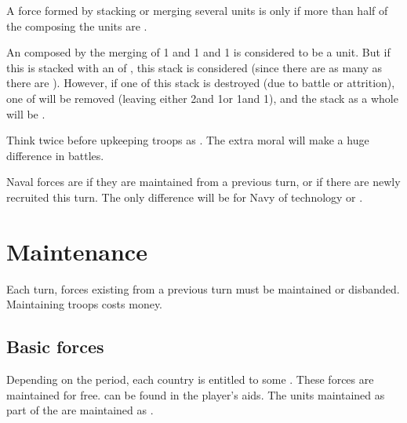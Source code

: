  A force formed by stacking or merging several units is
 only if more than half of the \LD composing the units are
.
\begin{exemple}
  An \ARMY\faceplus composed by the merging of 1  \LD and 1
   \ARMY\facemoins and 1  \LD is considered to
  be a  unit. But if this \ARMY\faceplus is stacked with an
  \ARMY\facemoins of , this stack is considered
   (since there are as many  as there are
  ). However, if one \LD of this stack is destroyed (due to
  battle or attrition), one \LD of  will be removed (leaving
  either 2\ARMY\facemoins and 1\LD or 1\ARMY\faceplus and 1\LD), and the stack
  as a whole will be .
\end{exemple}

\begin{designnote}
  Think twice before upkeeping troops as . The extra moral
  will make a huge difference in battles.
\end{designnote}

\aparag[Navy] Naval forces are  if they are maintained from a
previous turn, or  if there are newly recruited this turn.
\bparag The only difference will be for Navy of technology  or
.%





\section{Maintenance}\label{chExpenses:Maintenance}

\aparag Each turn, forces existing from a previous turn must be maintained or
disbanded. Maintaining troops costs money.



\subsection{Basic forces}

\aparag Depending on the period, each country is entitled to some . These forces are maintained for free.  can be
found in the player's aids.
\bparag The units maintained as part of the  are
maintained as .

